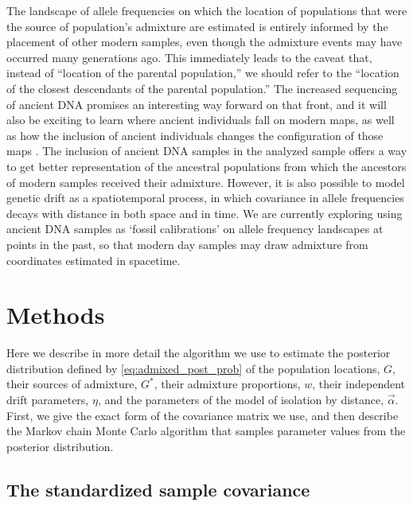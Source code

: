 \documentclass[12pt]{article}
\newcommand{\identifyadmixsource}[1]{{#1^{*}}}
\begin{document}
The landscape of allele frequencies on which the location of populations that were the source of population's admixture
are estimated is entirely informed by the placement of other modern samples,
even though the admixture events may have occurred many generations ago.
This immediately leads to the caveat that, instead of ``location of the parental population,''
we should refer to the ``location of the closest descendants of the parental population.''
The increased sequencing of ancient DNA \citep[see][for a recent review]{pickrell_reich:14} promises an interesting way forward on that front,
and it will also be exciting to learn where ancient individuals fall on modern maps, 
as well as how the inclusion of ancient individuals changes the configuration of those maps \citep{skoglund_investigating_2014}.
The inclusion of ancient DNA samples in the analyzed sample offers a way to get better representation of the ancestral populations from which the ancestors of modern samples received their admixture.  
However, it is also possible to model genetic drift as a spatiotemporal process, 
in which covariance in allele frequencies decays with distance in both space and in time.  
We are currently exploring using ancient DNA samples as  `fossil calibrations' on allele frequency landscapes at points in the past, 
so that modern day samples may draw admixture from coordinates estimated in spacetime.

\newpage


\section*{Methods}

Here we describe in more detail the algorithm we use to estimate the posterior distribution defined by \eqref{eq:admixed_post_prob} 
of the population locations, $G$, 
their sources of admixture, $\identifyadmixsource{G}$, 
their admixture proportions, $w$, 
their independent drift parameters, $\eta$, 
and the parameters of the model of isolation by distance, $\vec{\alpha}$.  
First, we give the exact form of the covariance matrix we use,
and then describe the Markov chain Monte Carlo algorithm 
that samples parameter values from the posterior distribution.


\subsection*{The standardized sample covariance}
\label{ss:cov_methods}
\end{document}
